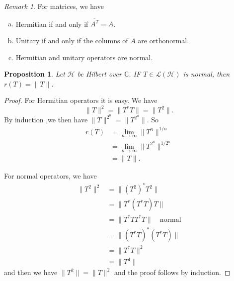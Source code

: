 \documentclass[10pt, oneside, reqno]{amsart}
\theoremstyle{plain}%
\newtheorem{prop}[thm]{Proposition}
\theoremstyle{definition}
\theoremstyle{remark}
\newtheorem*{rem}{Remark}
\newcommand{\Com}{\mathbb{C}}
\begin{document}
\begin{rem}
    For matrices, we have \begin{enumerate}[(a)]
        \item Hermitian if and only if $\overline{A^T} = A$. 
        \item Unitary if and only if the columns of $A$ are orthonormal.
        \item Hermitian and unitary operators are normal.
    \end{enumerate}
\end{rem}

\begin{prop}
    Let $\mathcal H$ be Hilbert over $\Com$.  IF $T \in \mathcal L(\mathcal H)$ is normal, then $r(T) = \| T \|$.  
\end{prop}

\begin{proof}
    For Hermitian operators it is easy.  We have \[
        \| T \|^2 = \| T^* T \| = \| T^2 \|.
    \]  By induction ,we then have $\| T \|^{2^n} = \| T^{2^n} \|$.  So \begin{align*}
        r(T) &= \lim_{n \rightarrow \infty} \| T^n \|^{1/n} \\
            &= \lim_{n \rightarrow \infty} \| T^{2^n} \|^{1/{2^n}} \\
            &= \| T \|.
    \end{align*}  
    
    For normal operators, we have \begin{align*}
        \| T^2 \|^2 &= \| (T^2)^* T^2 \| \\
                    &= \| T^*(T^* T) T \| \\
                    &= \| T^* T T^* T \| \quad \text{normal} \\
                    &= \| (T^* T)^* (T^* T) \|  \\
                    &= \| T^* T \|^2 \\
                    &= \| T^4 \|   
    \end{align*} and then we have $\| T^2 \| = \| T \|^2$ and the proof follows by induction.
\end{proof}
\end{document}
